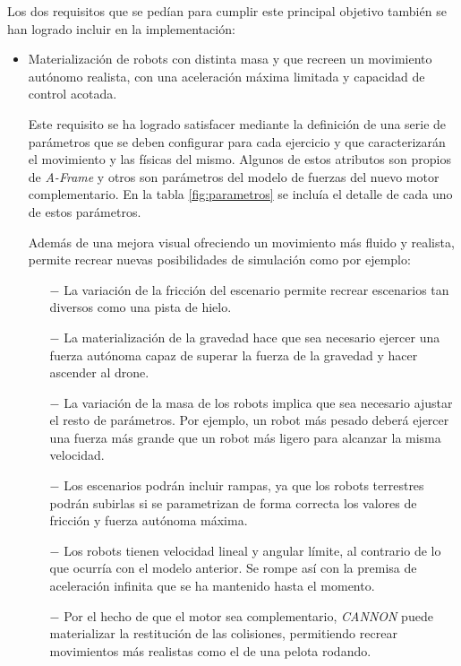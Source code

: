 Los dos requisitos que se pedían para cumplir este principal objetivo también se han logrado incluir en la implementación:

\begin{itemize}
    \item Materialización de robots con distinta masa y que recreen un movimiento autónomo realista, con una aceleración máxima limitada y capacidad de control acotada.
    
    Este requisito se ha logrado satisfacer mediante la definición de una serie de parámetros que se deben configurar para cada ejercicio y que caracterizarán el movimiento y las físicas del mismo. Algunos de estos atributos son propios de \textit{A-Frame} y otros son parámetros del modelo de fuerzas del nuevo motor complementario. En la tabla \ref{fig:parametros} se incluía el detalle de cada uno de estos parámetros. \newline
    
    Además de una mejora visual ofreciendo un movimiento más fluido y realista, permite recrear nuevas posibilidades de simulación como por ejemplo:
    
    \begin{itemize}
        \item [$-$] La variación de la fricción del escenario permite recrear escenarios tan diversos como una pista de hielo.
        \item [$-$] La materialización de la gravedad hace que sea necesario ejercer una fuerza autónoma capaz de superar la fuerza de la gravedad y hacer ascender al drone.
        \item [$-$] La variación de la masa de los robots implica que sea necesario ajustar el resto de parámetros. Por ejemplo, un robot más pesado deberá ejercer una fuerza más grande que un robot más ligero para alcanzar la misma velocidad.
        \item [$-$] Los escenarios podrán incluir rampas, ya que los robots terrestres podrán subirlas si se parametrizan de forma correcta los valores de fricción y fuerza autónoma máxima.
        \item [$-$] Los robots tienen velocidad lineal y angular límite, al contrario de lo que ocurría con el modelo anterior. Se rompe así con la premisa de aceleración infinita que se ha mantenido hasta el momento.
        \item [$-$] Por el hecho de que el motor sea complementario, \textit{CANNON} puede materializar la restitución de las colisiones, permitiendo recrear movimientos más realistas como el de una pelota rodando.
    \end{itemize}
    

\end{itemize}
